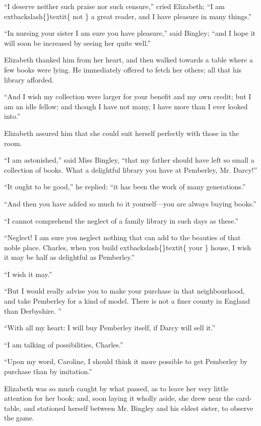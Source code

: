\documentclass[10pt]{book}
\begin{document}
   “I deserve neither such praise nor such censure,” cried
   Elizabeth; “I
am
   	extbackslash\{\}textit\{
    not
   \}
   a great reader, and I have pleasure in many things.”
  

   “In nursing your sister I am sure you have pleasure,” said Bingley; “and
I hope it will soon be increased by seeing her quite well.”
  

   Elizabeth thanked him from her heart, and then walked towards a table
where a few books were lying. He immediately offered to fetch her
others; all that his library afforded.
  

   “And I wish my collection were larger for your benefit and my own
credit; but I am an idle fellow; and though I have not many, I have more
than I ever looked into.”
  

   Elizabeth assured him that she could suit herself perfectly with those
in the room.
  

   “I am astonished,” said Miss Bingley, “that my father should have left
so small a collection of books. What a delightful library you have at
Pemberley, Mr. Darcy!”
  

   “It ought to be good,” he replied: “it has been the work of many
generations.”
  

   “And then you have added so much to it yourself—you are always buying
books.”
  

   “I cannot comprehend the neglect of a family library in such days as
these.”
  

   “Neglect! I am sure you neglect nothing that can add to the beauties of
that noble place. Charles, when you build
   	extbackslash\{\}textit\{
    your
   \}
   house, I wish it may be
half as delightful as Pemberley.”
  

   “I wish it may.”
  

   “But I would really advise you to make your purchase in that
neighbourhood, and take Pemberley for a kind of model. There is not a
finer county in England than Derbyshire.
   ”
  

   “With all my heart: I will buy Pemberley itself, if Darcy will sell it.”
  

   “I am talking of possibilities, Charles.”
  

   “Upon my word, Caroline, I should think it more possible to get
Pemberley by purchase than by imitation.”
  

   Elizabeth was so much caught by what passed, as to leave her very little
attention for her book; and, soon laying it wholly aside, she drew near
the card-table, and stationed herself between Mr. Bingley and his eldest
sister, to observe the game.
  
\end{document}
